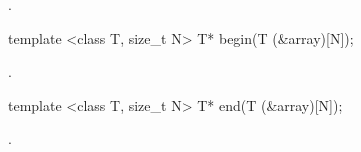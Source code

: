 \begin{itemdescr}
\pnum
\returns {}.
\end{itemdescr}

%
\begin{itemdecl}
template <class T, size_t N> T* begin(T (&array)[N]);
\end{itemdecl}

\begin{itemdescr}
\pnum
\returns {}.
\end{itemdescr}

%
\begin{itemdecl}
template <class T, size_t N> T* end(T (&array)[N]);
\end{itemdecl}

\begin{itemdescr}
\pnum
\returns {}.
\end{itemdescr}
